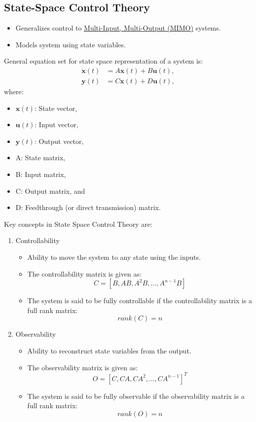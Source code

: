 \documentclass{article}
\begin{document}
\subsection{State-Space Control Theory}
\begin{itemize}
    \item Generalizes control to \underline{Multi-Input, Multi-Output (MIMO)} systems.
    \item Models system using state variables.
\end{itemize}
General equation set for state space representation of a system is:
\begin{align}
    \dot{\mathbf{x}}(t) &= A\mathbf{x}(t) + B\mathbf{u}(t), \\
    \mathbf{y}(t) &= C\mathbf{x}(t) + D\mathbf{u}(t),
\end{align}
where:
\begin{itemize}
    \item $\mathbf{x}(t)$: State vector,
    \item $\mathbf{u}(t)$: Input vector,
    \item $\mathbf{y}(t)$: Output vector,
    \item A: State matrix,
    \item B: Input matrix,
    \item C: Output matrix, and
    \item D: Feedthrough (or direct transmission) matrix.
\end{itemize}
Key concepts in State Space Control Theory are:
\begin{enumerate}
    \item Controllability
        \begin{itemize}
            \item Ability to move the system to any state using the inputs.
            \item The controllability matrix is given as:              
                \[ C = [B, AB, A^2B, ..., A^{n-1}B] \]
            \item The system is said to be fully controllable if the controllability matrix is a full rank matrix:
                \[ rank(C) = n \]
        \end{itemize}
    \item Observability
        \begin{itemize}
            \item Ability to reconstruct state variables from the output.
            \item The observability matrix is given as:
                \[ O = [C, CA, CA^2, ..., CA^{n-1}]^{T} \]
            \item The system is said to be fully observable if the observability matrix is a full rank matrix:
                \[ rank(O) = n \]
        \end{itemize}
\end{enumerate}
\end{document}
